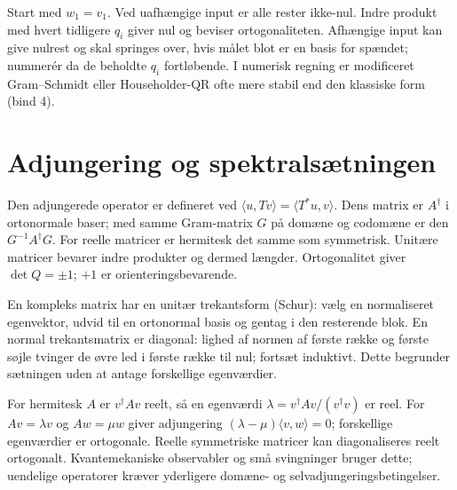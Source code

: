 Start med $w_1=v_1$. Ved uafhængige input er alle rester ikke-nul.
Indre produkt med hvert tidligere $q_i$ giver nul og beviser
ortogonaliteten. Afhængige input kan give nulrest og skal springes over,
hvis målet blot er en basis for spændet; nummerér da de beholdte $q_i$ fortløbende.
I numerisk regning er modificeret Gram--Schmidt eller Householder-QR
ofte mere stabil end den klassiske form (bind 4).



\section{Adjungering og spektralsætningen}
Den adjungerede operator er defineret ved
$\langle u,Tv\rangle=\langle T^*u,v\rangle$.
Dens matrix er $A^\dagger$ i ortonormale baser; med samme Gram-matrix
$G$ på domæne og codomæne er den $G^{-1}A^\dagger G$.
For reelle matricer er hermitesk det samme som symmetrisk.
Unitære matricer bevarer indre produkter og dermed længder.
Ortogonalitet giver $\det Q=\pm1$; $+1$ er orienteringsbevarende.





En kompleks matrix har en unitær trekantsform (Schur): vælg en normaliseret
egenvektor, udvid til en ortonormal basis og gentag i den resterende blok.
En normal trekantsmatrix er diagonal: lighed af normen af første række
og første søjle tvinger de øvre led i første række til nul; fortsæt induktivt.
Dette begrunder sætningen uden at antage forskellige egenværdier.

For hermitesk $A$ er $v^\dagger Av$ reelt, så en egenværdi
$\lambda=v^\dagger Av/(v^\dagger v)$ er reel.
For $Av=\lambda v$ og $Aw=\mu w$ giver adjungering
$(\lambda-\mu)\langle v,w\rangle=0$; forskellige egenværdier er ortogonale.
Reelle symmetriske matricer kan diagonaliseres reelt ortogonalt.
Kvantemekaniske observabler og små svingninger bruger dette; uendelige
operatorer kræver yderligere domæne- og selvadjungeringsbetingelser.

